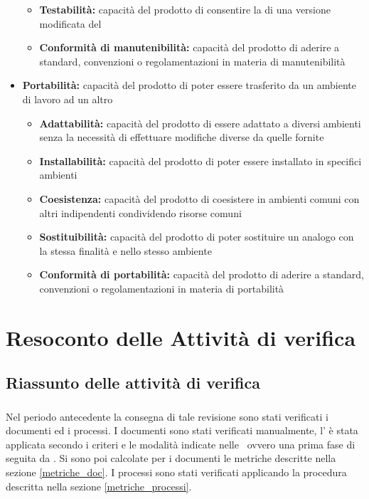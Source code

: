 \documentclass[12pt,a4paper]{article}
\begin{document}
\begin{itemize}
\begin{itemize}
		\item \textbf{Testabilità:} capacità del prodotto  di consentire la  di una versione modificata del  
		\item \textbf{Conformità di manutenibilità:} capacità del prodotto  di aderire a standard, convenzioni o regolamentazioni in materia di manutenibilità
	\end{itemize}
	\item \textbf{Portabilità:} capacità del prodotto  di poter essere trasferito da un ambiente di lavoro ad un altro
	\begin{itemize}
		\item \textbf{Adattabilità:} capacità del prodotto  di essere adattato a diversi ambienti senza la necessità di effettuare modifiche diverse da quelle fornite
		\item \textbf{Installabilità:} capacità del prodotto  di poter essere installato in specifici ambienti
		\item \textbf{Coesistenza:} capacità del prodotto  di coesistere in ambienti comuni con altri   indipendenti condividendo risorse comuni
		\item \textbf{Sostituibilità:} capacità del prodotto  di poter sostituire un  analogo con la stessa finalità e nello stesso ambiente
		\item \textbf{Conformità di portabilità:} capacità del prodotto  di aderire a standard, convenzioni o regolamentazioni in materia di portabilità
	\end{itemize}
\end{itemize}

\newpage
\appendix
\section{Resoconto delle Attività di verifica} \label{Resoconto delle attività di verifica}
\subsection{Riassunto delle \textbf{attività} di verifica} 
\subsubsection{\RR}
Nel periodo antecedente la consegna di tale revisione sono stati verificati i documenti ed i processi.
I documenti sono stati verificati manualmente, l' è stata applicata secondo i criteri e le modalità indicate nelle \NdP\, ovvero una prima fase di  seguita da .
Si sono poi calcolate per i documenti le metriche descritte nella sezione \ref{metriche_doc}.
I processi sono stati verificati applicando la procedura descritta nella sezione \ref{metriche_processi}.
\end{document}
